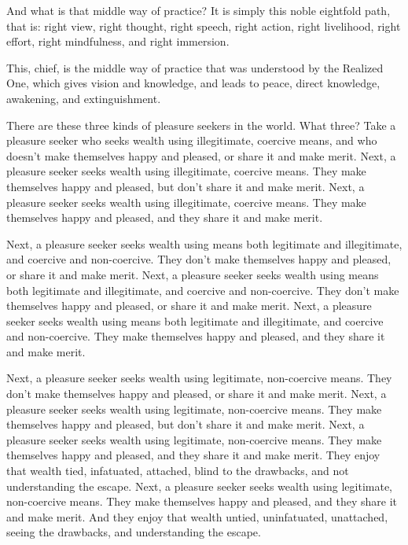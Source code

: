 \documentclass[12pt,openany]{book}%
\begin{document}
And what is that middle way of practice? It is simply this noble eightfold path, that is: right view, right thought, right speech, right action, right livelihood, right effort, right mindfulness, and right immersion. 

This, chief, is the middle way of practice that was understood by the Realized One, which gives vision and knowledge, and leads to peace, direct knowledge, awakening, and extinguishment. 

There are these three kinds of pleasure seekers in the world. What three? Take a pleasure seeker who seeks wealth using illegitimate, coercive means, and who doesn’t make themselves happy and pleased, or share it and make merit. Next, a pleasure seeker seeks wealth using illegitimate, coercive means. They make themselves happy and pleased, but don’t share it and make merit. Next, a pleasure seeker seeks wealth using illegitimate, coercive means. They make themselves happy and pleased, and they share it and make merit. 

Next, a pleasure seeker seeks wealth using means both legitimate and illegitimate, and coercive and non-coercive. They don’t make themselves happy and pleased, or share it and make merit. Next, a pleasure seeker seeks wealth using means both legitimate and illegitimate, and coercive and non-coercive. They don’t make themselves happy and pleased, or share it and make merit. Next, a pleasure seeker seeks wealth using means both legitimate and illegitimate, and coercive and non-coercive. They make themselves happy and pleased, and they share it and make merit. 

Next, a pleasure seeker seeks wealth using legitimate, non-coercive means. They don’t make themselves happy and pleased, or share it and make merit. Next, a pleasure seeker seeks wealth using legitimate, non-coercive means. They make themselves happy and pleased, but don’t share it and make merit. Next, a pleasure seeker seeks wealth using legitimate, non-coercive means. They make themselves happy and pleased, and they share it and make merit. They enjoy that wealth tied, infatuated, attached, blind to the drawbacks, and not understanding the escape. Next, a pleasure seeker seeks wealth using legitimate, non-coercive means. They make themselves happy and pleased, and they share it and make merit. And they enjoy that wealth untied, uninfatuated, unattached, seeing the drawbacks, and understanding the escape. 
\end{document}

